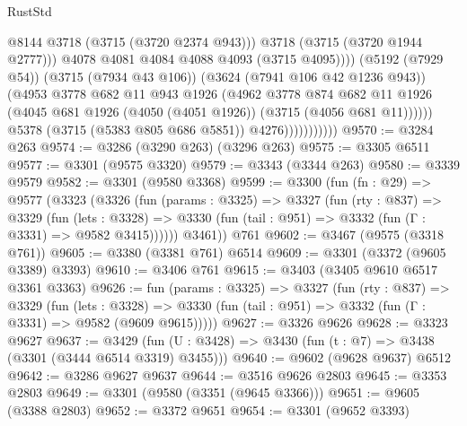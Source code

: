 \begin{lexlean}{RustStd}
\begin{coremodule}
                                      @8144
                                      @3718
                                      (@3715 (@3720 @2374 @943)))
                                    @3718
                                    (@3715 (@3720 @1944 @2777)))
                                  @4078
                                  @4081
                                  @4084
                                  @4088
                                  @4093
                                  (@3715 @4095))))
                            (@5192 (@7929 @54))
                            (@3715 (@7934 @43 @106))
                            (@3624 (@7941 @106 @42 @1236 @943))
                            (@4953
                              @3778
                              @682
                              @11
                              @943
                              @1926
                              (@4962
                                @3778
                                @874
                                @682
                                @11
                                @1926
                                (@4045 @681 @1926 (@4050 (@4051 @1926)) (@3715 (@4056 @681 @11))))))
                          @5378
                          (@3715 (@5383 @805 @686 @5851))
                          @4276)))))))))))
@9570 := @3284 @263
@9574 := @3286 (@3290 @263) (@3296 @263)
@9575 := @3305 @6511
@9577 := @3301 (@9575 @3320)
@9579 := @3343 (@3344 @263)
@9580 := @3339 @9579
@9582 := @3301 (@9580 @3368)
@9599 := @3300
    (fun (fn : @29) =>
    @9577
      (@3323
        (@3326
          (fun (params : @3325) =>
          @3327
            (fun (rty : @837) =>
            @3329
              (fun (lets : @3328) =>
              @3330 (fun (tail : @951) => @3332 (fun (Γ : @3331) => @9582 @3415))))))
        @3461))
    @761
@9602 := @3467 (@9575 (@3318 @761))
@9605 := @3380 (@3381 @761) @6514
@9609 := @3301 (@3372 (@9605 @3389) @3393)
@9610 := @3406 @761
@9615 := @3403 (@3405 @9610 @6517 @3361 @3363)
@9626 := fun (params : @3325) =>
  @3327
    (fun (rty : @837) =>
    @3329
      (fun (lets : @3328) =>
      @3330 (fun (tail : @951) => @3332 (fun (Γ : @3331) => @9582 (@9609 @9615)))))
@9627 := @3326 @9626
@9628 := @3323 @9627
@9637 := @3429 (fun (U : @3428) => @3430 (fun (t : @7) => @3438 (@3301 (@3444 @6514 @3319) @3455)))
@9640 := @9602 (@9628 @9637) @6512
@9642 := @3286 @9627 @9637
@9644 := @3516 @9626 @2803
@9645 := @3353 @2803
@9649 := @3301 (@9580 (@3351 (@9645 @3366)))
@9651 := @9605 (@3388 @2803)
@9652 := @3372 @9651
@9654 := @3301 (@9652 @3393)

\end{coremodule}
\end{lexlean}
